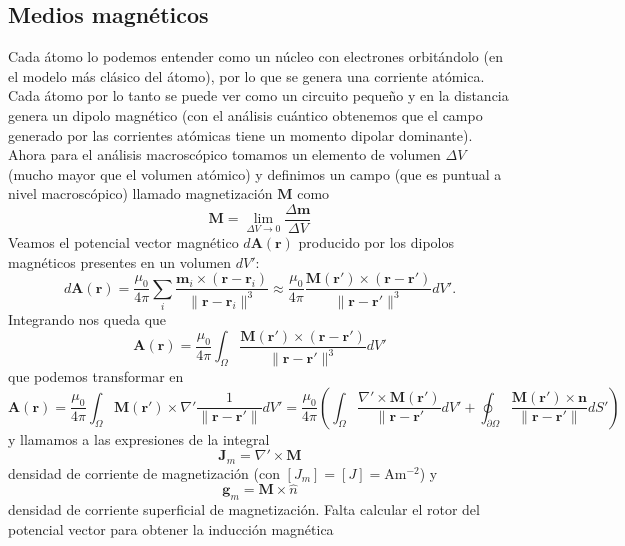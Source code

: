 \documentclass[11pt,a4paper]{article}
\numberwithin{equation}{section}
\begin{document}
\subsection{Medios magnéticos}
Cada átomo lo podemos entender como un núcleo con electrones orbitándolo (en el modelo más clásico del átomo), por lo que se genera una corriente atómica. Cada átomo por lo tanto se puede ver como un circuito pequeño y en la distancia genera un dipolo magnético (con el análisis cuántico obtenemos que el campo generado por las corrientes atómicas tiene un momento dipolar dominante). Ahora para el análisis macroscópico tomamos un elemento de volumen $\Delta V$ (mucho mayor que el volumen atómico) y definimos un campo (que es puntual a nivel macroscópico) llamado magnetización $\textbf{M}$ como 
\begin{equation}
    \textbf{M} = \lim_{\Delta V \to 0} \frac{\Delta \textbf{m}}{\Delta V}
    \label{eq:m_magnetizacion}
\end{equation}
Veamos el potencial vector magnético $d\textbf{A}(\textbf{r})$ producido por los dipolos magnéticos presentes en un volumen $dV'$: \[d\textbf{A}(\textbf{r}) = \frac{\mu_0}{4\pi} \sum_i \frac{\textbf{m}_i \times (\textbf{r} - \textbf{r}_i)}{\|\textbf{r} - \textbf{r}_i\|^3} \approx \frac{\mu_0}{4\pi} \frac{\textbf{M}(\textbf{r}') \times (\textbf{r} - \textbf{r}')}{\|\textbf{r} - \textbf{r}'\|^3} dV'.\] Integrando nos queda que
\begin{equation}
    \textbf{A}(\textbf{r}) = \frac{\mu_0}{4\pi} \int_{\Omega} \frac{\textbf{M}(\textbf{r}') \times (\textbf{r} - \textbf{r}')}{\|\textbf{r} - \textbf{r}'\|^3} dV'
    \label{eq:m_potencial_vector_materia}
\end{equation}
que podemos transformar en \[\textbf{A}(\textbf{r}) = \frac{\mu_0}{4\pi} \int_{\Omega} \textbf{M}(\textbf{r}') \times \nabla'\frac{1}{\|\textbf{r} - \textbf{r}'\|} dV' = \frac{\mu_0}{4\pi} \left(\int_{\Omega} \frac{\nabla' \times \textbf{M}(\textbf{r}')}{\|\textbf{r} - \textbf{r}'} dV' + \oint_{\partial \Omega} \frac{\textbf{M}(\textbf{r}') \times \textbf{n}}{\|\textbf{r} - \textbf{r}'\|} dS'\right)\]
y llamamos a las expresiones de la integral
\begin{equation}
    \textbf{J}_m = \nabla' \times \textbf{M}
    \label{eq:m_corriente_magnetizacion}
\end{equation}
densidad de corriente de magnetización (con $[J_m] = [J] = \text{A}\text{m}^{-2}$) y 
\begin{equation}
    \textbf{g}_m = \textbf{M} \times \hat{n}
    \label{eq:m_corriente_magnetizacion_superficie}
\end{equation}
densidad de corriente superficial de magnetización. Falta calcular el rotor del potencial vector para obtener la inducción magnética 
\end{document}
